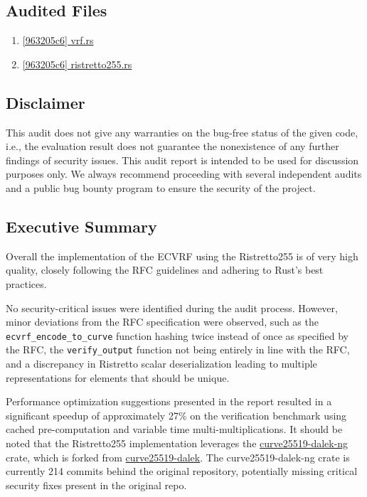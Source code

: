 \subsection{Audited Files} 
\begin{enumerate}
    \item{\href{https://github.com/MystenLabs/fastcrypto/blob/963205c6d0538fe548b8b10037cf87a53af6f424/fastcrypto/src/vrf.rs}{[963205c6] vrf.rs}}
    \item{\href{https://github.com/MystenLabs/fastcrypto/blob/main/fastcrypto/src/groups/ristretto255.rs}{[963205c6] ristretto255.rs}}
\end{enumerate}

\subsection{Disclaimer}
This audit does not give any warranties on the bug-free status of the given code, i.e., the evaluation result does not guarantee the nonexistence of any further findings of security issues. This audit report is intended to be used for discussion purposes only. We always recommend proceeding with several independent audits and a public bug bounty program to ensure the security of the project.

\subsection{Executive Summary}
Overall the implementation of the ECVRF using the Ristretto255 is of very high quality, closely following the RFC guidelines and adhering to Rust's best practices.

No security-critical issues were identified during the audit process. However, minor deviations from the RFC specification were observed, such as the \lstinline{ecvrf_encode_to_curve} function hashing twice instead of once as specified by the RFC, the \lstinline{verify_output} function not being entirely in line with the RFC, and a discrepancy in Ristretto scalar deserialization leading to multiple representations for elements that should be unique.

Performance optimization suggestions presented in the report resulted in a significant speedup of approximately 27\% on the verification benchmark using cached pre-computation and variable time multi-mul\-ti\-pli\-ca\-tions. It should be noted that the Ristretto255 implementation leverages the \href{https://github.com/zkcrypto/curve25519-dalek-ng}{curve25519-dalek-ng} crate, which is forked from \href{https://github.com/dalek-cryptography/curve25519-dalek}{curve25519-dalek}. The curve25519-dalek-ng crate is currently 214 commits behind the original repository, potentially missing critical security fixes present in the original repo.

